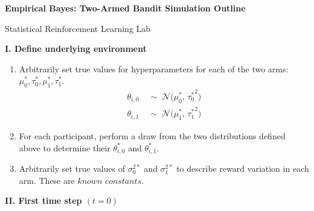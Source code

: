 \documentclass[letterpaper, 11pt]{extarticle}
\begin{document}
\begin{Large}
    \textsf{\textbf{Empirical Bayes: Two-Armed Bandit Simulation Outline}}   \par
    Statistical Reinforcement Learning Lab
\end{Large}

\vspace{2ex}

\textsf{\textbf {I. Define underlying environment}}

\begin{enumerate}
    \item Arbitrarily set true values for hyperparameters for each of the two arms: $\mu_0^*, \tau_0^*, \mu_1^*, \tau_1^*$.
    \begin{align*}
    \theta_{i,0} &\;\sim\; \mathcal{N}\!\big(\mu_0^*, \, {\tau_0^*}^2\big)\\
    \theta_{i,1} &\;\sim\; \mathcal{N}\!\big(\mu_1^*, \, {\tau_1^*}^2\big)   
    \end{align*}
    
    \item For each participant, perform a draw from the two distributions defined above to determine their $\theta_{i,0}^*$ and $\theta_{i,1}^*$.
    \item Arbitrarily set true values of $\sigma_{0}^{2*}$ and $\sigma_{1}^{2*}$ to describe reward variation in each arm. These are $\textit{known constants}$.
\end{enumerate}

\textsf{\textbf {II. First time step $(t=0)$}}
\end{document}
